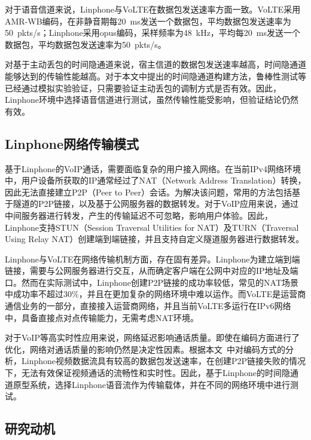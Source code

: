 对于语音信道来说，Linphone与VoLTE在数据包发送速率方面一致。VoLTE采用AMR-WB编码，在非静音期每{20\ ms}发送一个数据包，平均数据包发送速率为{50\ pkts/s}；Linphone采用opus编码，采样频率为{48\ kHz}，平均每{20\ ms}发送一个数据包，平均数据包发送速率为{50\ pkts/s}。

对基于主动丢包的时间隐通道来说，宿主信道的数据包发送速率越高，时间隐通道能够达到的传输性能越高。对于本文中提出的时间隐通道构建方法，鲁棒性测试等已经通过模拟实验验证，只需要验证主动丢包的调制方式是否有效。因此，Linphone环境中选择语音信道进行测试，虽然传输性能受影响，但验证结论仍然有效。

\subsection{Linphone网络传输模式}
\label{chap:linphone:motivation:net}

基于Linphone的VoIP通话，需要面临复杂的用户接入网络。在当前IPv4网络环境中，用户设备所获取的IP通常经过了NAT（Network Address Translation）转换，因此无法直接建立P2P（Peer to Peer）会话。为解决该问题，常用的方法包括基于隧道的P2P链接，以及基于公网服务器的数据转发。对于VoIP应用来说，通过中间服务器进行转发，产生的传输延迟不可忽略，影响用户体验。因此，Linphone支持STUN（Session Traversal Utilities for NAT）及TURN（Traversal Using Relay NAT）创建端到端链接，并且支持自定义隧道服务器进行数据转发。

Linphone与VoLTE在网络传输机制方面，存在固有差异。Linphone为建立端到端链接，需要与公网服务器进行交互，从而确定客户端在公网中对应的IP地址及端口。然而在实际测试中，Linphone创建P2P链接的成功率较低，常见的NAT场景中成功率不超过30\%，并且在更加复杂的网络环境中难以运作。而VoLTE是运营商通信业务的一部分，直接接入运营商网络，并且当前VoLTE多运行在IPv6网络中，具备直接点对点传输能力，无需考虑NAT环境。

对于VoIP等高实时性应用来说，网络延迟影响通话质量。即使在编码方面进行了优化，网络对通话质量的影响仍然是决定性因素。根据本文\ 中对编码方式的分析，Linphone视频数据流具有较高的数据包发送速率，在创建P2P链接失败的情况下，无法有效保证视频通话的流畅性和实时性。因此，基于Linphone的时间隐通道原型系统，选择Linphone语音流作为传输载体，并在不同的网络环境中进行测试。

\subsection{研究动机}
\label{chap:linphone:motivation:sum}

